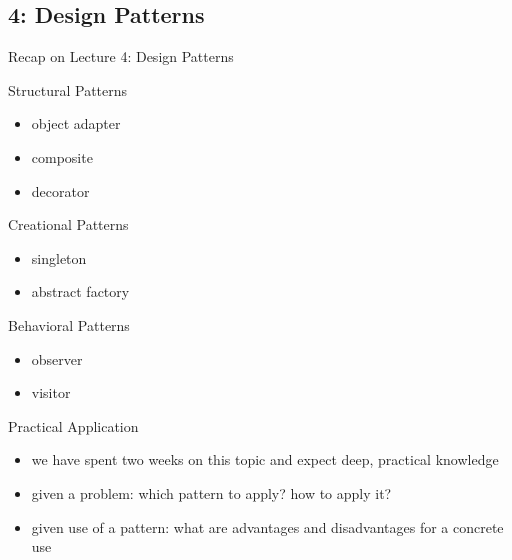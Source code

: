 \subsection{4: Design Patterns}
\begin{frame}{Recap on Lecture 4: Design Patterns}
	\begin{fancycolumns}
		\begin{note}{Structural Patterns}
			\begin{itemize}
				\item object adapter
				\item composite
				\item decorator
			\end{itemize}
		\end{note}
	\nextcolumn
		\begin{note}{Creational Patterns}
			\begin{itemize}
				\item singleton
				\item abstract factory
			\end{itemize}
		\end{note}
		\begin{note}{Behavioral Patterns}
			\begin{itemize}
				\item observer
				\item visitor
			\end{itemize}
		\end{note}
	\end{fancycolumns}
	\begin{example}{Practical Application}
		\begin{itemize}
			\item we have spent two weeks on this topic and expect deep, practical knowledge
			\item given a problem: which pattern to apply? how to apply it?
			\item given use of a pattern: what are advantages and disadvantages for a concrete use
		\end{itemize}
	\end{example}
\end{frame}

